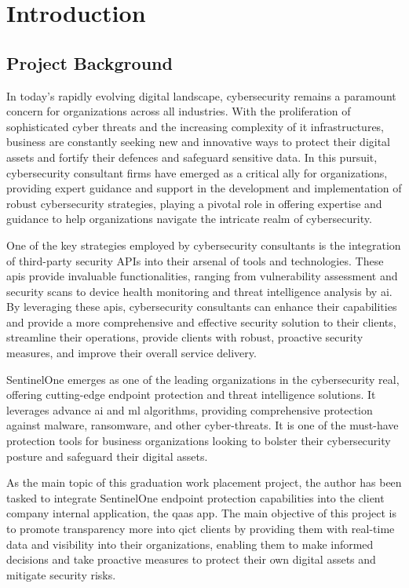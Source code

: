 \chapter{Introduction}
\section{Project Background}
In today's rapidly evolving digital landscape, cybersecurity remains a paramount concern for organizations
across all industries. With the proliferation of sophisticated cyber threats and the increasing complexity of
\acrshort{it} infrastructures, business are constantly seeking new and innovative ways to protect their
digital assets and fortify their defences and safeguard sensitive data. In this pursuit, cybersecurity
consultant firms have emerged as a critical ally for organizations, providing expert guidance and support in
the development and implementation of robust cybersecurity strategies, playing a pivotal role in offering
expertise and guidance to help organizations navigate the intricate realm of cybersecurity.

One of the key strategies employed by cybersecurity consultants is the integration of third-party security
\gls{API}s into their arsenal of tools and technologies. These \acrshort{api}s provide invaluable
functionalities, ranging from vulnerability assessment and security scans to device health monitoring and
threat intelligence analysis by \acrshort{ai}. By leveraging these \acrshort{api}s, cybersecurity consultants
can enhance their capabilities and provide a more comprehensive and effective security solution to their
clients, streamline their operations, provide clients with robust, proactive security measures, and improve
their overall service delivery.

SentinelOne emerges as one of the leading organizations in the cybersecurity real, offering cutting-edge
endpoint protection and threat intelligence solutions. It leverages advance \acrshort{ai} and \acrshort{ml}
algorithms, providing comprehensive protection against malware, ransomware, and other cyber-threats. It is one
of the must-have protection tools for business organizations looking to bolster their cybersecurity posture
and safeguard their digital assets.

As the main topic of this graduation work placement project, the author
has been tasked to integrate SentinelOne endpoint protection capabilities into the client company internal
application, the \acrshort{qaas} app. The main objective of this project is to promote transparency more
into \acrshort{qict} clients by providing them with real-time data and visibility into their organizations,
enabling them to make informed decisions and take proactive measures to protect their own digital assets and
mitigate security risks.

